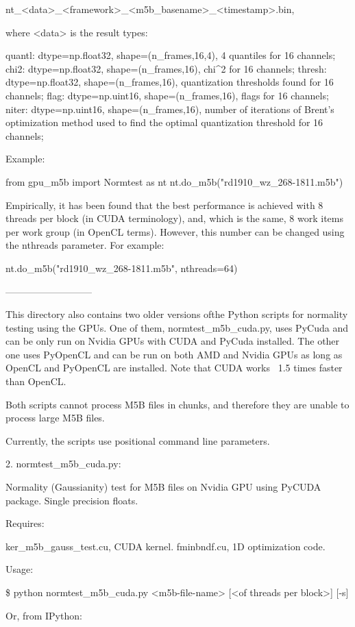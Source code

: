 \documentclass[letterpaper,twoside,12pt]{article}
\begin{document}
    nt_<data>_<framework>_<m5b_basename>_<timestamp>.bin,

where <data> is the result types:

quantl: dtype=np.float32, shape=(n_frames,16,4), 4 quantiles for 16 channels;
chi2:   dtype=np.float32, shape=(n_frames,16), chi^2 for 16 channels;
thresh: dtype=np.float32, shape=(n_frames,16), quantization thresholds found
        for 16 channels;
flag:   dtype=np.uint16, shape=(n_frames,16), flags for 16 channels; 
niter:  dtype=np.uint16, shape=(n_frames,16), number of iterations of Brent's
        optimization method used to find the optimal quantization threshold
        for 16 channels;

   
Example:
   
from gpu_m5b import Normtest as nt
nt.do_m5b("rd1910_wz_268-1811.m5b")

Empirically, it has been found that the best performance is achieved 
with 8 threads per block (in CUDA terminology), and, which is the same, 
8 work items per work group (in OpenCL terms). However, this number can 
be changed using the nthreads parameter. For example:

nt.do_m5b("rd1910_wz_268-1811.m5b", nthreads=64)


---------------------------

This directory also contains two older versions ofthe Python scripts for
normality testing using the GPUs. One of them, normtest_m5b_cuda.py, uses
PyCuda and can be only run on Nvidia GPUs with CUDA and PyCuda installed.
The other one uses PyOpenCL and can be run on both AMD and Nvidia GPUs as
long as OpenCL and PyOpenCL are installed. Note that CUDA works ~1.5 times
faster than OpenCL.

Both scripts cannot process M5B files in chunks, and therefore they are unable
to process large M5B files.

Currently, the scripts use positional command line parameters.

2. normtest_m5b_cuda.py:

Normality (Gaussianity) test for M5B files on Nvidia GPU using PyCUDA package.
Single precision floats.

Requires:

ker_m5b_gauss_test.cu, CUDA kernel.
fminbndf.cu, 1D optimization code.

Usage:

\$ python normtest_m5b_cuda.py <m5b-file-name> [<of threads per block>] [-s]

Or, from IPython:
\end{document}
